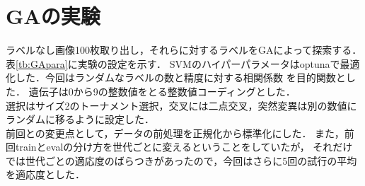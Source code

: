 \documentclass[twocolumn]{jarticle}     %
\begin{document}
\begin{table}[h]
	\centering
	\caption{結果\label{tb:res1}}
\end{table}

\section{GAの実験}

ラベルなし画像100枚取り出し，それらに対するラベルをGAによって探索する．
表\ref{tb:GApara}に実験の設定を示す．
SVMのハイパーパラメータはoptunaで最適化した．今回はランダムなラベルの数と精度に対する相関係数
を目的関数とした．
遺伝子は0から9の整数値をとる整数値コーディングとした．\\
選択はサイズ2のトーナメント選択，交叉には二点交叉，突然変異は別の数値にランダムに移るように設定した．\\
前回との変更点として，データの前処理を正規化から標準化にした．
また，前回trainとevalの分け方を世代ごとに変えるということをしていたが，
それだけでは世代ごとの適応度のばらつきがあったので，今回はさらに5回の試行の平均を適応度とした．

\begin{table}[h]
	\centering
	\caption{GAの設定\label{tb:GApara}}
\end{table}
\end{document}
